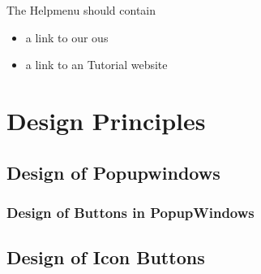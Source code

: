 \documentclass{scrreprt}
\begin{document}
The Helpmenu should contain 
\begin{itemize}
    \item a link to our ous
    \item a link to an Tutorial website
\end{itemize}

\section{Design Principles}\label{cap:Designprinciples}
\subsection{Design of Popupwindows}\label{cap:Designprinciples_Popupwindows}
\subsubsection{Design of Buttons in PopupWindows}\label{cap:Designprinciples_PopupWindowButtons}
\subsection{Design of Icon Buttons}\label{cap:Designprinciples_IconButtons}







\printglossaries
\end{document}
